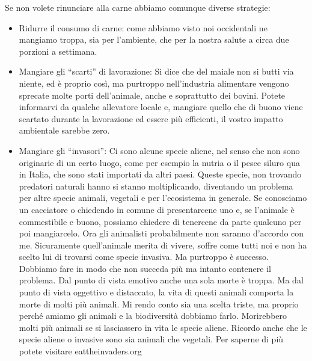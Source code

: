 \documentclass[12pt]{book} %
\begin{document}
\bigskip

Se non volete rinunciare alla carne abbiamo comunque diverse strategie:

\begin{itemize}
\item Ridurre il consumo di carne: come abbiamo visto noi occidentali ne mangiamo troppa, sia per
l'ambiente, che per la nostra salute a circa due porzioni a settimana.
\item Mangiare gli “scarti” di lavorazione: Si dice che del maiale non si butti via niente, ed è proprio così, ma
purtroppo nell'industria alimentare vengono sprecate molte porti
dell'animale, anche e soprattutto dei bovini. Potete informarvi da qualche allevatore locale e,
mangiare quello che di buono viene scartato durante la lavorazione ed essere più efficienti, il vostro impatto
ambientale sarebbe zero.
\item Mangiare gli “invasori”: Ci sono alcune specie aliene, nel senso che non sono originarie di un certo luogo, come
per esempio la nutria o il pesce siluro qua in Italia, che sono stati importati da altri paesi. Queste specie, non
trovando predatori naturali hanno si stanno moltiplicando, diventando un problema per altre specie animali, vegetali e
per l'ecosistema in generale. Se conosciamo un cacciatore o chiedendo in comune di presentarcene
uno e, se l'animale è commestibile e buono, possiamo chiedere di tenercene da parte qualcuno per
poi mangiarcelo. Ora gli animalisti probabilmente non saranno d'accordo con me. Sicuramente
quell'animale merita di vivere, soffre come tutti noi e non ha scelto lui di trovarsi come specie
invasiva. Ma purtroppo è successo. Dobbiamo fare in modo che non succeda più ma intanto contenere il problema. Dal
punto di vista emotivo anche una sola morte è troppa. Ma dal punto di vista oggettivo e distaccato, la vita di questi
animali comporta la morte di molti più animali. Mi rendo conto sia una scelta triste, ma proprio perché amiamo gli
animali e la biodiversità dobbiamo farlo. Morirebbero molti più animali se si lasciassero in vita le specie aliene.
Ricordo anche che le specie aliene o invasive sono sia animali che vegetali. Per saperne di più potete visitare
eattheinvaders.org
\end{itemize}

\bigskip
\end{document}
